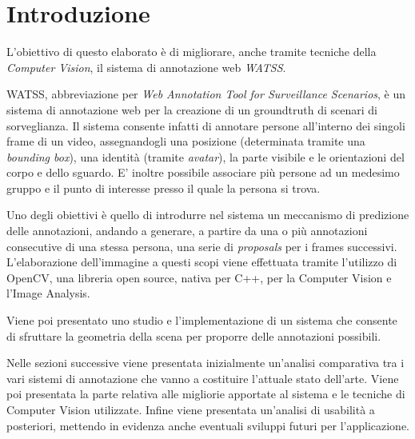 \section{Introduzione}

L'obiettivo di questo elaborato è di migliorare, anche tramite tecniche della \emph{Computer Vision}, il sistema di annotazione web \emph{WATSS}\cite{Bartoli:2015:WWA:2733373.2807411}.

WATSS, abbreviazione per \emph{Web Annotation Tool for Surveillance Scenarios}, è un sistema di annotazione web per la creazione di un groundtruth di scenari di sorveglianza. Il sistema consente infatti di annotare persone all'interno dei singoli frame di un video, assegnandogli una posizione (determinata tramite una \emph{bounding box}), una identità (tramite \emph{avatar}), la parte visibile e le orientazioni del corpo e dello sguardo. E' inoltre possibile associare più persone ad un medesimo gruppo e il punto di interesse presso il quale la persona si trova.


Uno degli obiettivi è quello di introdurre nel sistema un meccanismo di predizione delle annotazioni, andando a generare, a partire da una o più annotazioni consecutive di una stessa persona, una serie di \emph{proposals} per i frames successivi. 
L'elaborazione dell'immagine a questi scopi viene effettuata tramite l'utilizzo di OpenCV, una libreria open source, nativa per C++, per la Computer Vision e l'Image Analysis.

Viene poi presentato uno studio e l'implementazione di un sistema che consente di sfruttare la geometria della scena per proporre delle annotazioni possibili.

Nelle sezioni successive viene presentata inizialmente un'analisi comparativa tra i vari sistemi di annotazione che vanno a costituire l'attuale stato dell'arte. Viene poi presentata la parte relativa alle migliorie apportate al sistema e le tecniche di Computer Vision utilizzate. Infine viene presentata un'analisi di usabilità a posteriori, mettendo in evidenza anche eventuali sviluppi futuri per l'applicazione.